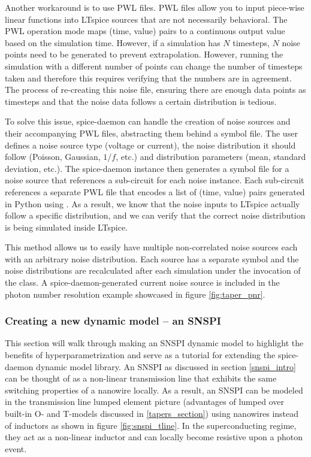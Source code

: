 Another workaround is to use PWL files. PWL files allow you to input piece-wise linear functions into LTspice
sources that are not necessarily behavioral. The PWL operation mode maps (time, value) pairs to a continuous 
output value based on the simulation time. However, if a simulation has $N$ timesteps, $N$ noise points need to be generated to prevent extrapolation.
However, running the simulation with a different number of points can change the number
of timesteps taken and therefore this requires verifying that the numbers are in agreement.
The process of re-creating this noise file, ensuring there are enough data points as timesteps and that the noise data follows a certain distribution is tedious.

To solve this issue, spice-daemon can handle the creation of noise sources and their accompanying PWL files,
abstracting them behind a symbol file. The user defines a noise source type (voltage or current), the 
noise distribution it should follow (Poisson, Gaussian, $1/f$, etc.) and distribution parameters (mean, 
standard deviation, etc.). The spice-daemon instance then generates a symbol file for a noise source that 
references a sub-circuit for each noise instance. Each sub-circuit references a 
separate PWL file that encodes a list of (time, value) pairs generated in Python using
. As a result, we know that the noise inputs to LTspice actually follow a specific distribution, and we
can verify that the correct noise distribution is being simulated inside LTspice.

This method  allows us to easily have multiple non-correlated noise sources each with an 
arbitrary noise  distribution. Each source has a separate symbol and the noise 
distributions are recalculated after each simulation under the invocation of the 
class. A spice-daemon-generated current noise source is included in the photon number resolution 
example showcased in figure \ref{fig:taper_pnr}.


\subsubsection{Creating a new dynamic model -- an SNSPI}

This section will walk through making an SNSPI dynamic model to highlight the benefits
of hyperparametrization and serve as a tutorial for extending the spice-daemon dynamic model library. 
An SNSPI as discussed in section \ref{snspi_intro} can be thought
of as a non-linear transmission line that exhibits the same switching properties of a nanowire
locally. As a result, an SNSPI can be modeled in the transmission line lumped element picture
(advantages of lumped over built-in O- and T-models discussed in \ref{tapers_section})
using nanowires instead of inductors as shown in figure
\ref{fig:snspi_tline}. In the superconducting regime, they act as a non-linear
inductor and can locally become resistive upon a photon event.

